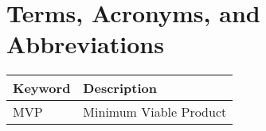 \chapter*{Terms, Acronyms, and Abbreviations}

\begin{tabular}{@{}>{\raggedright\arraybackslash}p{2cm} p{}@{}}
	\textbf{Keyword} & \textbf{Description} \\
	\hline
	MVP  & Minimum Viable Product \\
	\hline
\end{tabular}

\vspace{1cm}


\clearpage
